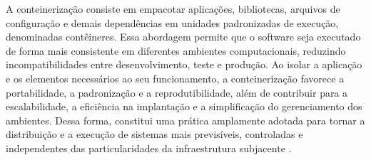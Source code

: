 A conteinerização consiste em empacotar aplicações, bibliotecas, arquivos de configuração e demais dependências em unidades padronizadas de execução, denominadas contêineres. Essa abordagem permite que o software seja executado de forma mais consistente em diferentes ambientes computacionais, reduzindo incompatibilidades entre desenvolvimento, teste e produção. Ao isolar a aplicação e os elementos necessários ao seu funcionamento, a conteinerização favorece a portabilidade, a padronização e a reprodutibilidade, além de contribuir para a escalabilidade, a eficiência na implantação e a simplificação do gerenciamento dos ambientes. Dessa forma, constitui uma prática amplamente adotada para tornar a distribuição e a execução de sistemas mais previsíveis, controladas e independentes das particularidades da infraestrutura subjacente \cite{docker2026}.
